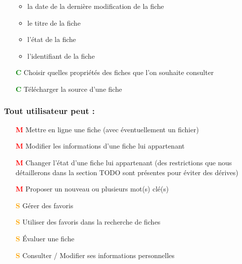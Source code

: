 \begin{itemize}
\begin{itemize}
            \item la date de la dernière modification de la \gls{fiche}
            \item le titre de la \gls{fiche}
            \item l'état de la \gls{fiche}
            \item l'identifiant de la \gls{fiche}
        \end{itemize}
    \item[\textcolor{green}{\textbf{C}}] Choisir quelles propriétés des \glspl{fiche} que l'on souhaite consulter
    \item[\textcolor{green}{\textbf{C}}] Télécharger la source d'une \gls{fiche} 
\end{itemize}

\subsubsection*{Tout utilisateur peut : }
\begin{itemize}
    \item[\textcolor{red}{\textbf{M}}] Mettre en ligne une \gls{fiche}  (avec éventuellement un fichier)
    \item[\textcolor{red}{\textbf{M}}] Modifier les informations d'une \gls{fiche}  lui appartenant
    \item[\textcolor{red}{\textbf{M}}] Changer l'état d'une \gls{fiche} lui appartenant (des restrictions que nous détaillerons dans la section TODO sont présentes pour éviter des dérives)
    \item[\textcolor{red}{\textbf{M}}] Proposer un nouveau ou plusieurs mot(s) clé(s)
    \item[\textcolor{orange}{\textbf{S}}] Gérer des favoris
    \item[\textcolor{orange}{\textbf{S}}] Utiliser des favoris dans la recherche de \gls{fiche}s
    \item[\textcolor{orange}{\textbf{S}}] Évaluer une \gls{fiche}  
    \item[\textcolor{orange}{\textbf{S}}] Consulter / Modifier ses informations personnelles
\end{itemize}

